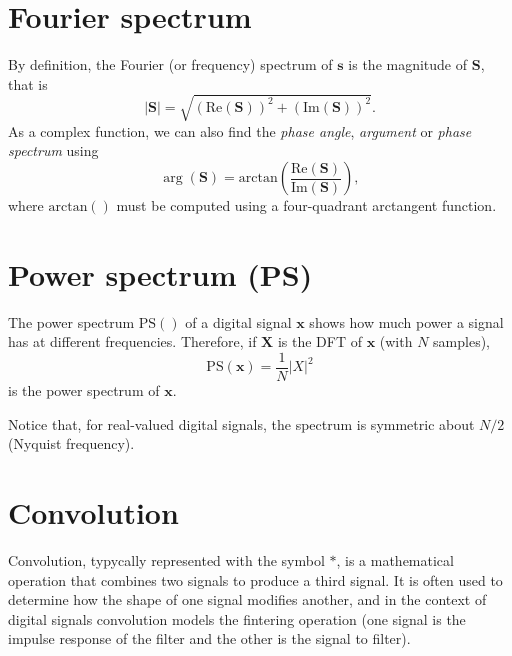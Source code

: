 
\section{Fourier spectrum}
\label{sec:Fourier_spectrum}

By definition, the Fourier
(or frequency) spectrum of $\mathbf{s}$ is the magnitude of
$\mathbf{S}$, that is
\begin{equation}
  |\mathbf{S}| = \sqrt{(\text{Re}(\mathbf{S}))^2+(\text{Im}(\mathbf{S}))^2}.
\end{equation}
As a complex function, we can also find the \emph{phase angle}, \emph{argument} or
\emph{phase spectrum} using
\begin{equation}
  \arg({\mathbf{S}}) = \text{arctan}\left(\frac{\text{Re}(\mathbf{S})}{\text{Im}(\mathbf{S})}\right),
\end{equation}
where $\text{arctan}()$ must be computed using a four-quadrant
arctangent function.


\section{Power spectrum (PS)}
\label{sec:power_spectrum}

The power spectrum $\text{PS}()$ of a digital signal $\mathbf{x}$
shows how much power a signal has at different frequencies. Therefore,
if $\mathbf{X}$ is the DFT of $\mathbf{x}$ (with $N$ samples),
\begin{equation}
  \text{PS}(\mathbf{x}) = \frac{1}{N}|X|^2
\end{equation}
is the power spectrum of $\mathbf{x}$.

Notice that, for real-valued digital signals, the spectrum is
symmetric about $N/2$ (Nyquist frequency).


\section{Convolution}
\label{sec:convolution}

Convolution, typycally represented with the symbol $\ast$, is a
mathematical operation that combines two signals to produce a third
signal. It is often used to determine how the shape of one signal
modifies another, and in the context of digital signals convolution
models the fintering operation (one signal is the impulse response of
the filter and the other is the signal to filter).

